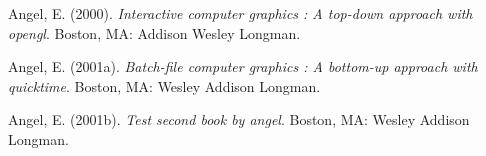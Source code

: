 \documentclass[12pt,twoside]{dukestatscithesis}
\theoremstyle{definition}
\theoremstyle{definition}
\theoremstyle{definition}
\theoremstyle{remark}
\begin{document}

\noindent

\setlength{\parindent}{-0.20in} \setlength{\leftskip}{0.20in}
\setlength{\parskip}{8pt}

\hypertarget{refs}{}
\hypertarget{ref-angel2000}{}
Angel, E. (2000). \emph{Interactive computer graphics : A top-down
approach with opengl}. Boston, MA: Addison Wesley Longman.

\hypertarget{ref-angel2001}{}
Angel, E. (2001a). \emph{Batch-file computer graphics : A bottom-up
approach with quicktime}. Boston, MA: Wesley Addison Longman.

\hypertarget{ref-angel2002a}{}
Angel, E. (2001b). \emph{Test second book by angel}. Boston, MA: Wesley
Addison Longman.


\end{document}
